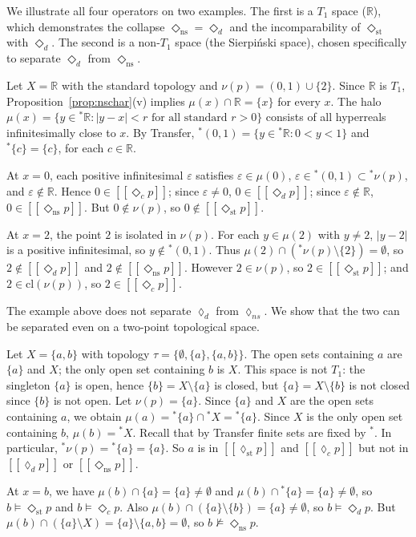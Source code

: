 \documentclass[submission,copyright,creativecommons]{eptcs}
\newcommand{\cl}{\mathrm{cl}}
\newcommand{\sem}[1]{[\![#1]\!]}
\newcommand{\diam}{\Diamond}
\newcommand{\str}{{{}^{*}\!}}
\newcommand{\lozengens}{\diam_\mathrm{ns}}
\newcommand{\lozengest}{\lozenge_\mathrm{st}}
\begin{document}
We illustrate all four operators on two examples. The first is a $T_1$ space
($\mathbb{R}$), which demonstrates the collapse $\lozengens = \diam_d$
and the incomparability of $\diam_\mathrm{st}$ with $\diam_d$. The second is
a non-$T_1$ space (the Sierpi\'{n}ski space), chosen specifically to separate $\diam_d$ from $\lozengens$.

\begin{example}
\label{ex:R}
Let $X = \mathbb{R}$ with the standard topology and $\nu(p) = (0,1) \cup \{2\}$.
Since $\mathbb{R}$ is $T_1$, Proposition~\ref{prop:nschar}(v) implies $\mu(x) \cap \mathbb{R} = \{x\}$ for every $x$. 
The halo  $\mu(x) = \{y \in \str \mathbb{R} : |y-x| < r \text{ for all standard } r>0\}$ consists of all hyperreals infinitesimally close to $x$.
By Transfer, $\str(0,1) = \{y \in \str \mathbb{R} : 0 < y < 1\}$ and $\str\{c\} = \{c\}$, for each $c \in \mathbb{R}$.


At $x=0$, each positive infinitesimal $\varepsilon$ satisfies $\varepsilon \in \mu(0)$,
$\varepsilon \in \str(0,1) \subset \str \nu(p)$, and $\varepsilon \notin \mathbb{R}$.
Hence $0 \in \sem{\diam_c p}$; since $\varepsilon \neq 0$, $0 \in \sem{\diam_d p}$; since $\varepsilon \notin \mathbb{R}$, $0 \in \sem{\lozengens p}$. 
But $0 \notin \nu(p)$, so $0 \notin \sem{\diam_\mathrm{st} p}$.

At $x=2$, the point $2$ is isolated in $\nu(p)$.
For each $y \in \mu(2)$ with $y \neq 2$, $|y-2|$ is a positive infinitesimal, so $y \notin \str(0,1)$.
Thus $\mu(2) \cap (\str \nu(p) \setminus \{2\}) = \emptyset$, 
so $2 \notin \sem{\diam_d p}$ and $2 \notin \sem{\lozengens p}$. 
However $2 \in \nu(p)$, so $2 \in \sem{\diam_\mathrm{st} p}$; and $2 \in \cl(\nu(p))$, so $2 \in \sem{\diam_c p}$.
\end{example}
The example above does not separate $\lozenge_d$ from $\lozenge_{ns}$.
We show that the two can be separated even on a two-point topological space.
\begin{example}
\label{ex:sierpinski}
Let $X = \{a,b\}$ with topology $\tau = \{\emptyset, \{a\}, \{a,b\}\}$.
The open sets containing $a$ are $\{a\}$ and $X$; the only open set containing $b$ is $X$. This space is not $T_1$: the singleton $\{a\}$ is open, hence $\{b\} = X \setminus \{a\}$ is closed, but
$\{a\} = X \setminus \{b\}$ is not closed since $\{b\}$ is not open.
Let $\nu(p) = \{a\}$.
Since $\{a\}$ and $X$ are the open sets containing $a$, we obtain
 $ \mu(a) = \str\{a\} \cap \str X = \str\{a\}$.
Since $X$ is the only open set containing $b$, $
  \mu(b) = \str X$.
Recall that by Transfer finite sets are fixed by $\str$.
In particular, $\str \nu(p) = \str\{a\} = \{a\}$.
So $a$ is in $\sem{ \lozengest p}$ and $\sem{\lozenge_c p}$ but not in $\sem{\lozenge_d p}$ or $\sem{\lozengens p}$.

At $x = b$, we have $\mu(b) \cap \{a\} = \{a\} \neq \emptyset$ and 
$\mu(b) \cap \str\{a\} = \{a\} \neq \emptyset$, so 
$b \models \diam_\mathrm{st} p$ and $b \models \diam_c p$.
Also $\mu(b) \cap (\{a\} \setminus \{b\}) = \{a\} \neq \emptyset$, 
so $b \models \diam_d p$.
But $\mu(b) \cap (\{a\} \setminus X) = \{a\} \setminus \{a,b\} = \emptyset$, 
so $b \not\models \lozengens p$.
\end{example}
\end{document}
